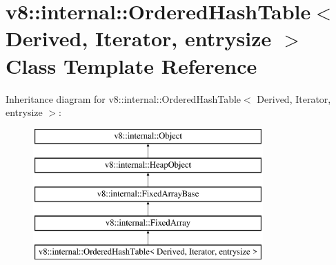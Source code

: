 \hypertarget{classv8_1_1internal_1_1_ordered_hash_table}{}\section{v8\+:\+:internal\+:\+:Ordered\+Hash\+Table$<$ Derived, Iterator, entrysize $>$ Class Template Reference}
\label{classv8_1_1internal_1_1_ordered_hash_table}
Inheritance diagram for v8\+:\+:internal\+:\+:Ordered\+Hash\+Table$<$ Derived, Iterator, entrysize $>$\+:\begin{figure}[H]
\begin{center}
\leavevmode
\includegraphics[height=5.000000cm]{classv8_1_1internal_1_1_ordered_hash_table}
\end{center}
\end{figure}
